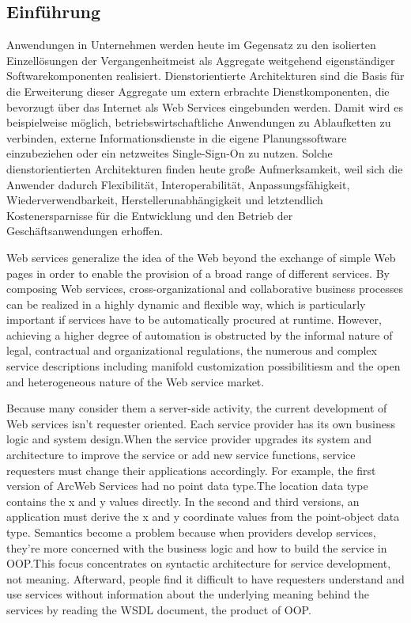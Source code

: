 
\subsection{Einführung}

Anwendungen in Unternehmen werden heute im Gegensatz zu den isolierten Einzellösungen
der Vergangenheitmeist als Aggregate weitgehend eigenständiger Softwarekomponenten realisiert.
Dienstorientierte Architekturen sind die Basis für die Erweiterung dieser Aggregate um
extern erbrachte Dienstkomponenten, die bevorzugt über das Internet als Web Services eingebunden
werden. Damit wird es beispielweise möglich, betriebswirtschaftliche Anwendungen zu
Ablaufketten zu verbinden, externe Informationsdienste in die eigene Planungssoftware einzubeziehen
oder ein netzweites Single-Sign-On zu nutzen. Solche dienstorientierten Architekturen
finden heute große Aufmerksamkeit, weil sich die Anwender dadurch Flexibilität, Interoperabilität,
Anpassungsfähigkeit, Wiederverwendbarkeit, Herstellerunabhängigkeit und letztendlich
Kostenersparnisse für die Entwicklung und den Betrieb der Geschäftsanwendungen erhoffen. \cite{addo}

Web services generalize the idea of the Web beyond the exchange of simple Web pages in order to enable the provision of a broad range of different services. By composing Web services, cross-organizational and collaborative business processes can be realized in a highly dynamic and flexible way, which is particularly important if services have to be automatically procured at runtime. However, achieving a higher degree of automation is obstructed by the informal nature of legal, contractual and organizational regulations, the numerous and complex service descriptions including manifold customization possibilitiesm and the open and heterogeneous nature of the Web service market.

Because many consider them a server-side activity, the
current development of Web services isn’t requester oriented.
Each service provider has its own business logic and
system design.When the service provider upgrades its system
and architecture to improve the service or add new
service functions, service requesters must change their
applications accordingly. For example, the first version of
ArcWeb Services had no point data type.The location data
type contains the x and y values directly. In the second and
third versions, an application must derive the x and y coordinate
values from the point-object data type. Semantics
become a problem because when providers develop services,
they’re more concerned with the business logic and
how to build the service in OOP.This focus concentrates
on syntactic architecture for service development, not
meaning. Afterward, people find it difficult to have
requesters understand and use services without information
about the underlying meaning behind the services by
reading the WSDL document, the product of OOP. \cite{shi1}

